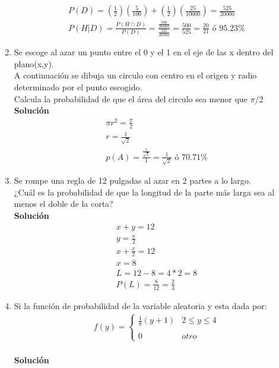 \begin{enumerate}
\begin{gather*}
    P(D) = (\frac{1}{2})(\frac{5}{100})+(\frac{1}{2})(\frac{25}{10000})=\frac{525}{20000}\\
    P(H|D) = \frac{P(H \cap D)}{P(D)} = \frac{\frac{500}{20000}}{\frac{525}{20000}} = \frac{500}{525} = \frac{20}{21} \text{ ó } 95.23\%
    \end{gather*}
    \item Se escoge al azar un punto entre el 0 y el 1 en el eje de las x dentro del plano(x,y).\\A continuación se dibuja un circulo con centro en el origen y radio determinado por el punto escogido.\\Calcula la probabilidad de que el área del circulo sea menor que $\pi$/2
    \\\textbf{Solución}
    \begin{gather*}
    \pi r^{2}=\frac{\pi}{2}\\
    r=\frac{1}{\sqrt{2}}\\
    p(A) = \frac{\frac{1}{\sqrt{2}}}{1}=\frac{1}{\sqrt{2}} \text{ ó } 70.71\%
    \end{gather*}
    \item Se rompe una regla de 12 pulgadas al azar en 2 partes a lo largo.\\
    ¿Cuál es la probabilidad de que la longitud de la parte más larga sea al menos el doble de la corta?
    \\\textbf{Solución}
    \begin{gather*}
    x + y = 12\\
    y = \frac{x}{2}\\
    x + \frac{x}{2} = 12\\
    x = 8\\
    L = 12 - 8 = 4*2 = 8\\
    P(L)=\frac{8}{12}=\frac{2}{3}
    \end{gather*}
    \item Si la función de probabilidad de la variable aleatoria y esta dada por:
    \begin{gather*}
    f(y)= \left\{ \begin{array}{lcc}
    \frac{1}{8}(y+1) & 2 \leq y \leq 4\\
    \\ 0 & otro 
    \end{array}
    \right.
    \end{gather*}
    \\\textbf{Solución}
    \\
    \begin{gather*}

\end{gather*}
\end{enumerate}
